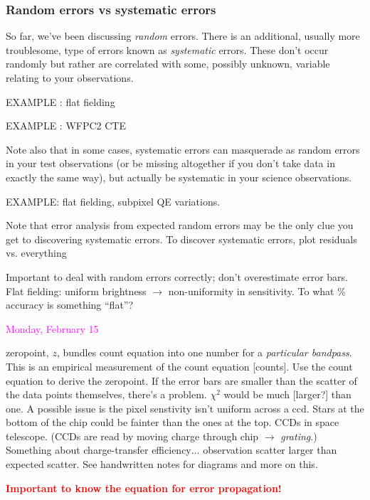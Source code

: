 \documentclass[12pt]{article}
\begin{document}
\subsubsection*{Random errors vs systematic errors}
So far, we've been discussing \emph{random} errors.
There is an additional,
usually more troublesome, type of errors known as \emph{systematic} errors.
These don't occur randomly but rather are correlated with some,
possibly unknown, variable relating to your observations.

EXAMPLE : flat fielding

EXAMPLE : WFPC2 CTE

Note also that in some cases, systematic errors can masquerade as
random errors in your test observations (or be missing altogether if
you don't take data in exactly the same way), but actually be
systematic in your science observations.

EXAMPLE: flat fielding, subpixel QE variations.

Note that error analysis from expected random errors may be the only
clue you get to discovering systematic errors. To discover systematic
errors, plot residuals vs. everything

\textcolor{om}{\emph{}}

\textcolor{myBlue}{Important to deal with random errors correctly;
    don't overestimate error bars.
    Flat fielding: uniform brightness $\rightarrow$ non-uniformity in
    sensitivity. To what \% accuracy is something ``flat''?
}

\textcolor{magenta}{Monday, February 15}

\textcolor{myBlue}{zeropoint, $z$, bundles count equation into one
    number for a \emph{particular bandpass}. This is an empirical
    measurement of the count equation [counts]. Use the count
    equation to derive the zeropoint.
    If the error bars are smaller than the scatter of the data points
    themselves, there's a problem. $\chi^2$ would be much [larger?]
    than one.
    A possible issue is the pixel senstivity isn't uniform across a
    ccd. Stars at the bottom of the chip could be fainter than the
    ones at the top. CCDs in space telescope. (CCDs are read
    by moving charge through chip $\rightarrow$ \emph{grating}.)
    Something about charge-transfer efficiency$\ldots$ observation
    scatter larger than expected scatter.
    See handwritten notes for diagrams and more on this.
}

\textcolor{red}{\textbf{Important to know the equation for error
propagation!}
}
\end{document}
